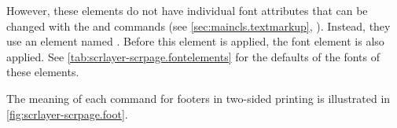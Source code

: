 \BeginIndexGroup
{}%
%
However, these elements do not have individual font attributes that can be
changed with the  and
 commands (see
\autoref{sec:maincls.textmarkup}, ).
Instead, they use an element named
. Before this element
is applied, the font element
 is also
applied. See \autoref{tab:scrlayer-scrpage.fontelements} for the defaults of
the fonts of these elements.%
\EndIndexGroup

The meaning of each command for footers in two-sided printing is illustrated
in \autoref{fig:scrlayer-scrpage.foot}.%
%
